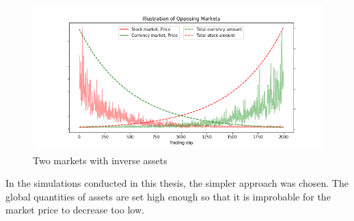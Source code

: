 \begin{figure}
    \includegraphics[width=\linewidth]{plots/opposing_markets.png}
    \caption{Two markets with inverse assets}
    \label{fig:opposing_markets}
\end{figure}

In the simulations conducted in this thesis, the simpler approach was chosen. 
The global quantities of assets are set high enough so that it is improbable 
for the market price to decrease too low. 

